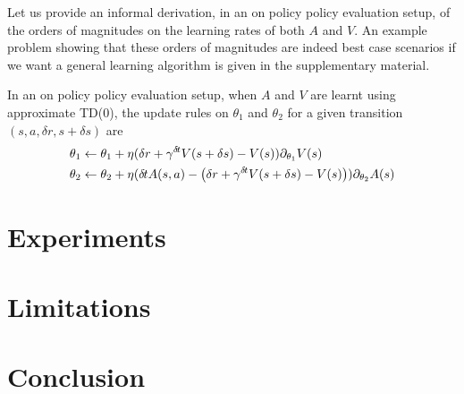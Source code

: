 \documentclass{article}
\begin{document}
Let us provide an informal derivation, in an on policy policy evaluation setup,
of the orders of magnitudes on the learning rates of both $A$ and $V$. An
example problem showing that these orders of magnitudes are indeed best case
scenarios if we want a general learning algorithm is given in the supplementary
material.

In an on policy policy evaluation setup, when $A$ and $V$ are learnt using
approximate TD(0), the update rules on $\theta_1$ and $\theta_2$ for a given
transition $(s, a, \delta r, s + \delta s)$ are
\begin{align}
	\theta_1 &\leftarrow \theta_1 + \eta (\delta r + \gamma^{\delta\hspace{-.1em}t} V(s + \delta s) - V(s)) \partial_{\theta_1} V(s)\\
	\theta_2 &\leftarrow \theta_2 + \eta (\delta\hspace{-.1em}t A(s, a) - \left(\delta r + \gamma^{\delta\hspace{-.1em}t} V(s + \delta s) - V(s)\right)) \partial_{\theta_2} A(s)
\end{align}



\section{Experiments}
\label{sec:exp}

\section{Limitations}
\label{sec:limitations}
\section{Conclusion}
\label{sec:concl}



\end{document}
